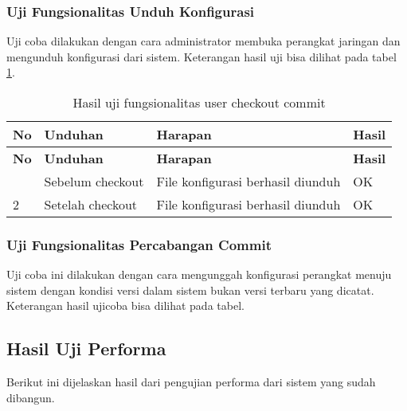 	\subsubsection{Uji Fungsionalitas Unduh Konfigurasi}
	Uji coba dilakukan dengan cara administrator membuka perangkat jaringan dan mengunduh konfigurasi dari sistem. Keterangan hasil uji bisa dilihat pada tabel \ref{hasilUnduhKonfig}.
	\begin{longtable}{|p{}|p{}|p{}|p{}|}
		
		\caption{Hasil uji fungsionalitas user checkout commit} \label{hasilUnduhKonfig} \\
		\hline
		\textbf{No} & \textbf{Unduhan} & \textbf{Harapan} & \textbf{Hasil} \\ \hline
		\endfirsthead
		\hline
		\textbf{No} & \textbf{Unduhan} & \textbf{Harapan} & \textbf{Hasil} \\ \hline
		\endhead
		\endfoot
		\endlastfoot
		1 & Sebelum checkout & File konfigurasi berhasil diunduh & OK\\ \hline
		2 & Setelah checkout & File konfigurasi berhasil diunduh & OK\\ \hline
		
	\end{longtable}
	
	
	\subsubsection{Uji Fungsionalitas Percabangan Commit}
	Uji coba ini dilakukan dengan cara mengunggah konfigurasi perangkat menuju sistem dengan kondisi versi dalam sistem bukan versi terbaru yang dicatat. Keterangan hasil ujicoba bisa dilihat pada tabel.
	
   	
    \subsection{Hasil Uji Performa}
    Berikut ini dijelaskan hasil dari pengujian performa dari sistem yang sudah dibangun.
    	